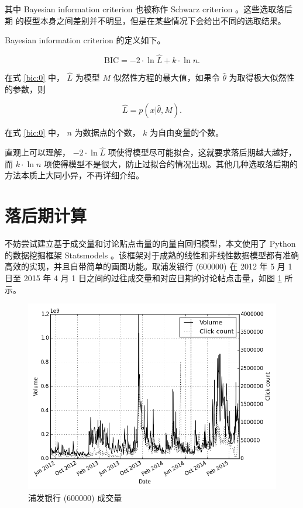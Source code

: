 其中 Bayesian information criterion 也被称作 Schwarz criterion 。这些选取落后期
的模型本身之间差别并不明显，但是在某些情况下会给出不同的选取结果。

Bayesian information criterion 的定义如下。

\begin{equation}
  \label{bic:0}
  \text{BIC}=-2\cdot \ln \hat{L}+k\cdot \ln n.
\end{equation}

在式 \ref{bic:0} 中， $\hat{L}$ 为模型 $M$ 似然性方程的最大值，如果令 $\hat{\theta}$ 为取得极大似然性的参数，则

\begin{equation}
  \label{bic:1}
  \hat{L}=p(x|\hat{\theta},M).
\end{equation}

在式 \ref{bic:0} 中， $n$ 为数据点的个数， $k$ 为自由变量的个数。

直观上可以理解， $-2\cdot \ln \hat{L}$ 项使得模型尽可能拟合，这就要求落后期越大越好，而 $k\cdot \ln n$ 项使得模型不是很大，防止过拟合的情况出现。其他几种选取落后期的方法本质上大同小异，不再详细介绍。

\section{落后期计算}

不妨尝试建立基于成交量和讨论贴点击量的向量自回归模型，本文使用了 Python 的数据挖掘框架 Statsmodels\cite{statsmodels} 。该框架对于成熟的线性和非线性数据模型都有准确高效的实现，并且自带简单的画图功能。取浦发银行 (600000) 在 2012 年 5 月 1 日至 2015 年 4 月 1  日之间的过往成交量和对应日期的讨论帖点击量，如图 \ref{auto_regression:0} 所示。

\begin{figure}
  \centering
  \includegraphics[width=\textwidth]{plots/auto_regression_0.png}
  \caption{浦发银行 (600000) 成交量}
  \label{auto_regression:0}
\end{figure}

